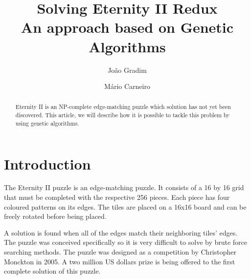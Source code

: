 \documentclass{llncs}
\begin{document}
%
\frontmatter          %
%
\pagestyle{headings}  %
%

\mainmatter              %
%
\title{Solving Eternity II Redux\\
	\small{An approach based on Genetic Algorithms}
}
%
%
\author{João Gradim \and Mário Carneiro}
%
%
%

\maketitle              %

\begin{abstract}
Eternity II is an NP-complete edge-matching puzzle which solution has not yet been discovered. This article, we will describe how it is possible to tackle this problem by using genetic algorithms.
\end{abstract}
%
\section{Introduction}\label{sec:introduction}


The Eternity II puzzle is an edge-matching puzzle. It consists of a 16 by 16 grid that must be completed with the respective 256 pieces. Each piece has four coloured patterns on its edges. The tiles are placed on a 16x16 board and can be freely rotated before being placed.


A solution is found when all of the edges match their neighboring tiles' edges. The puzzle was conceived specifically so it is very difficult to solve by brute force searching methods. The puzzle was designed as a competition by Christopher Monckton in 2005. A two million US dollars prize is being offered to the first complete solution of this puzzle.
\end{document}
